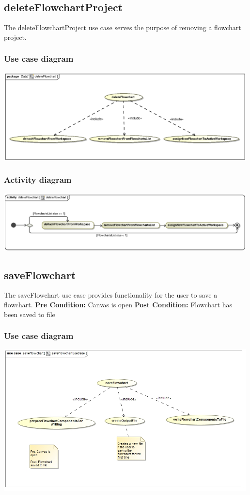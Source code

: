 \documentclass[11pt,a4paper,titlepage]{article}
\begin{document}
\subsection{deleteFlowchartProject}
The deleteFlowchartProject use case serves the purpose of removing a flowchart project.

\subsubsection{Use case diagram}
\includegraphics[width=500px]{deleteFlowchart.eps}

\subsubsection{Activity diagram}
\includegraphics[width=500px]{deleteFlowchartActivity.eps}

\subsection{saveFlowchart}
The saveFlowchart use case provides functionality for the user to save a flowchart.\newline\newline
\textbf{Pre Condition:} Canvas is open\newline\newline
\textbf{Post Condition:} Flowchart has been saved to file

\subsubsection{Use case diagram}
\includegraphics[width=500px]{saveFlowchartUseCase.jpg}
\end{document}

